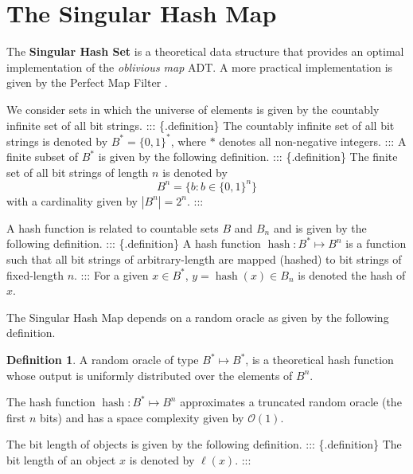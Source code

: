 \documentclass[
]{article}
\theoremstyle{definition}
\newtheorem{definition}{Definition}[section]
\theoremstyle{definition}
\theoremstyle{definition}
\theoremstyle{definition}
\theoremstyle{remark}
\begin{document}
\hypertarget{the-singular-hash-map}{%
\section{\texorpdfstring{The \textbf{Singular Hash Map}}{The Singular Hash Map}}\label{the-singular-hash-map}}

The \textbf{Singular Hash Set} is a theoretical data structure that provides an optimal
implementation of the \emph{oblivious map} ADT. A more practical implementation is
given by the Perfect Map Filter \citep{pmf}.

We consider sets in which the universe of elements is given by the countably infinite set of all bit strings.
::: \{.definition\}
The countably infinite set of all bit strings is denoted by \(B^* = \{0,1\}^*\),
where \(*\) denotes all non-negative integers.
:::
A finite subset of \(B^*\) is given by the following definition.
::: \{.definition\}
The finite set of all bit strings of length \(n\) is denoted by
\begin{equation}
    B^n = \bigl\{b \colon b \in \{0,1\}^n\bigr\}
\end{equation}
with a cardinality given by \(|B^n| = 2^n\).
:::

A hash function is related to countable sets \(B\) and \(B_n\) and is given by the following definition.
::: \{.definition\}
A hash function \(\operatorname{hash} : B^* \mapsto B^n\) is a function such that
all bit strings of arbitrary-length are mapped (hashed) to bit strings of
fixed-length \(n\).
:::
For a given \(x \in B^*\), \(y = \operatorname{hash}(x) \in B_n\) is denoted the hash of \(x\).

The Singular Hash Map depends on a random oracle as given by the following definition.

\begin{definition}
\protect\hypertarget{def:def:randomoracle}{}\label{def:def:randomoracle}A random oracle of type \(B^* \mapsto B^*\), is a theoretical hash function whose
output is uniformly distributed over the elements of \(B^n\).
\end{definition}

The hash function \(\operatorname{hash} : B^* \mapsto B^n\) approximates a
truncated random oracle (the first \(n\) bits) and has a space complexity given by
\(\mathcal{O}(1)\).

The bit length of objects is given by the following definition.
::: \{.definition\}
The bit length of an object \(x\) is denoted by \(\ell(x)\).
:::
\end{document}

